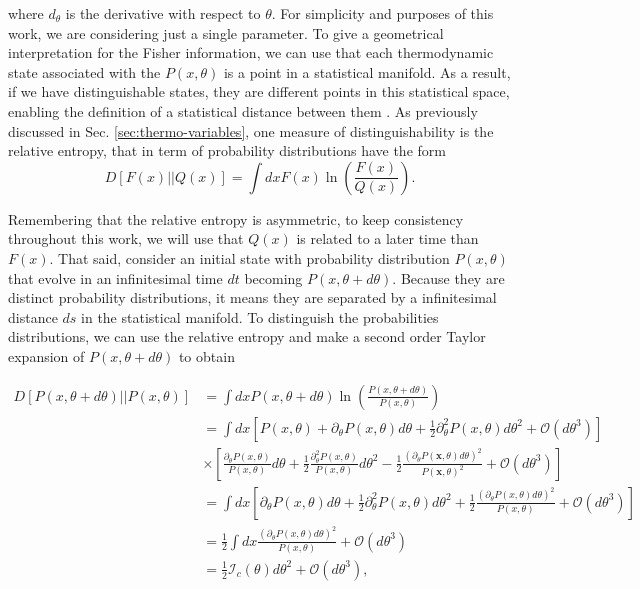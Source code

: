 \noindent where $d_\theta$ is the derivative with respect to $\theta$. For simplicity and purposes of this work, we are considering just a single parameter. To give a geometrical interpretation for the Fisher information, we can use that each thermodynamic state associated with the $P(x, \theta)$ is a point in a statistical manifold. As a result, if we have distinguishable states, they are different points in this statistical space, enabling the definition of a statistical distance between them \cite{dechant-2020,crooks-2007}. As previously discussed in Sec. \ref{sec:thermo-variables}, one measure of distinguishability is the relative entropy, that in term of probability distributions have the form
\begin{equation}
    D[F(x)|| Q(x)] = \int dx F(x) \ln \left ( \frac{F(x)}{Q(x)} \right ).
\end{equation}

\noindent Remembering that the relative entropy is asymmetric, to keep consistency throughout this work, we will use that $Q(x)$ is related to a later time than $F(x)$. That said, consider an initial state with probability distribution $P(x, \theta)$ that evolve in an infinitesimal time $dt$ becoming $P(x, \theta+d\theta)$. Because they are distinct probability distributions, it means they are separated by a infinitesimal distance $ds$ in the statistical manifold. To distinguish the probabilities distributions, we can use the relative entropy and make a second order Taylor expansion of $P(x, \theta+d\theta)$ to obtain

\begin{align}
    D[P(x, \theta+d\theta) || P(x, \theta)] &= \int dx P(x, \theta+d\theta) \ln \left ( \frac{P(x, \theta+d\theta)}{P(x, \theta)} \right ) \nonumber \\
        &= \int dx [P(x, \theta) + \partial_\theta P(x, \theta) d\theta + \frac{1}{2} \partial_\theta^2 P(x, \theta) d\theta^2 + \mathcal{O}(d\theta^3)] \nonumber\\
        &\times \left[\frac{\partial_\theta P(x, \theta)}{P(x, \theta)} d\theta + \frac{1}{2}\frac{\partial_\theta^2 P(x, \theta)}{P(x, \theta)} d\theta^2 - \frac{1}{2} \frac{(\partial_\theta P(\mathbf{x}, \theta)d\theta)^2}{P(\mathbf{x}, \theta)^2} + \mathcal{O}(d\theta^3) \right] \nonumber \\
        &= \int dx \left[\partial_\theta P(x, \theta) d\theta + \frac{1}{2} \partial_\theta^2 P(x, \theta) d\theta^2 + \frac{1}{2}\frac{(\partial_\theta P(x, \theta) d\theta)^2}{P(x, \theta)} + \mathcal{O}(d\theta^3) \right] \nonumber \\
        &= \frac{1}{2}\int dx \frac{(\partial_\theta P(x, \theta) d\theta)^2}{P(x, \theta)} + \mathcal{O}(d\theta^3) \nonumber\\
        &= \frac{1}{2}\mathcal{I}_c(\theta) d\theta^2 + \mathcal{O}(d\theta^3),
\end{align}

